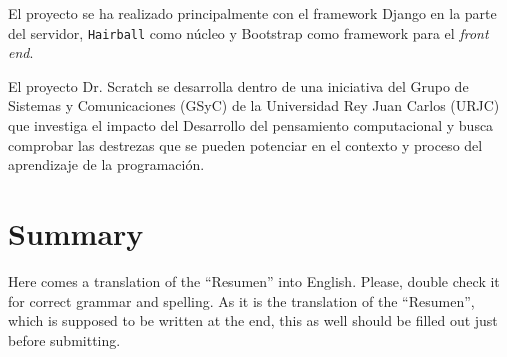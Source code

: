 \documentclass[a4paper, 12pt]{book}
\begin{document}
El proyecto se ha realizado principalmente con el framework Django en la parte del
servidor, \texttt{Hairball} como núcleo y Bootstrap como framework para el \emph{front end}.

El proyecto Dr. Scratch se desarrolla dentro de una iniciativa del Grupo de Sistemas
y Comunicaciones (GSyC) de la Universidad Rey Juan Carlos (URJC) que investiga el
impacto del Desarrollo del pensamiento computacional y busca comprobar las destrezas
que se pueden potenciar en el contexto y proceso del aprendizaje de la programación.




\chapter*{Summary}

Here comes a translation of the ``Resumen'' into English. Please, double check
it for correct grammar and spelling. As it is the translation of the ``Resumen'',
which is supposed to be written at the end, this as well should be filled out
just before submitting.




\tableofcontents
\cleardoublepage
\listoffigures %


\end{document}

